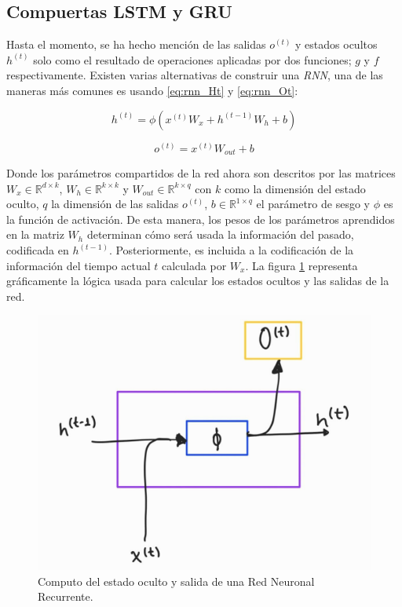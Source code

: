 \subsection{Compuertas LSTM y GRU}

Hasta el momento, se ha hecho mención de las salidas $o^{(t)}$ y estados ocultos $h^{(t)}$ solo como
el resultado de operaciones aplicadas por dos funciones; $g$ y $f$ respectivamente. Existen varias
alternativas de construir una \textit{RNN}, una de las maneras más comunes es usando
\ref{eq:rnn_Ht} y \ref{eq:rnn_Ot}:

\begin{equation}
    h^{(t)} = \phi(x^{(t)} W_{x} + h^{(t-1)} W_h + b)
    \label{eq:rnn_Ht}
\end{equation}

\begin{equation}
    o^{(t)} = x^{(t)} W_{out} + b
    \label{eq:rnn_Ot}
\end{equation}

Donde los parámetros compartidos de la red ahora son descritos por las matrices
$W_x \in \mathbb{R}^{d \times k}$, $W_h \in \mathbb{R}^{k \times k}$ y $
W_{out} \in \mathbb{R}^{k \times q}$ con $k$ como la dimensión del estado oculto, $q$ la dimensión
de las salidas $o^{(t)}$, $b \in \mathbb{R} ^ {1 \times q}$ el parámetro de sesgo y $\phi$ es la
función de activación. De esta manera, los pesos de los parámetros aprendidos en la matriz $W_h$
determinan cómo será usada la información del pasado, codificada en $h^{(t-1)}$. Posteriormente,
es incluida a la codificación de la información del tiempo actual $t$ calculada por $W_x$. La figura
\ref{fig:rnn_cell} representa gráficamente la lógica usada para calcular los estados ocultos y las
salidas de la red.


\begin{figure}
\centering
\includegraphics[width=0.4 \textwidth]{Chapters/2. Transformer/Figures/rnn/rnn_cell.jpg}
\caption{Computo del estado oculto y salida de una Red Neuronal Recurrente.}
\label{fig:rnn_cell}
\end{figure}

